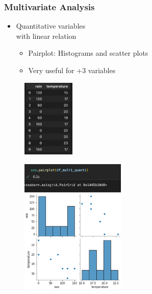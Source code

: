 \begin{frame}\frametitle{Multivariate Analysis}
   \begin{minipage}{0.48\linewidth}
      \begin{itemize}
         \item Quantitative variables\\
               with linear relation
         \begin{itemize}
            \item Pairplot: Histograms and scatter plots
            \item Very useful for +3 variables
         \end{itemize}
      \end{itemize}
      \vspace{.5cm}
      \begin{figure}[H]
         \includegraphics[width=2.5cm]{../images/illustrations/pattern_multivariate_quantitative_df.png}
      \end{figure}
   \end{minipage}
   \begin{minipage}{0.48\linewidth}
      \begin{figure}[H]
         \includegraphics[width=5cm]{../images/illustrations/pattern_multivariate_quantitative_pairplot.png}
      \end{figure}
   \end{minipage}
\end{frame}


